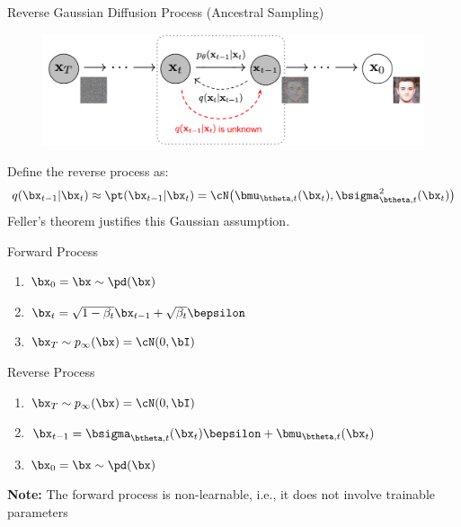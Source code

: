 \documentclass{beamer}
\begin{document}
\begin{frame}{Reverse Gaussian Diffusion Process (Ancestral Sampling)}
	\vspace{-0.3cm} 
	\begin{figure}
		\includegraphics[width=0.8\linewidth]{figs/DDPM}
	\end{figure}
	\vspace{-0.3cm} 
	Define the reverse process as: 
	\vspace{-0.2cm}
	\[
		q(\bx_{t-1}|\bx_{t}) \approx \pt(\bx_{t - 1} | \bx_t) = \cN\bigl(\bmu_{\btheta, t}(\bx_t), \bsigma^2_{\btheta, t}(\bx_t)\bigr)
	\]
	{\color{gray}Feller's theorem justifies this Gaussian assumption.}
	\eqpause
	\begin{minipage}{0.5\linewidth}
		\begin{block}{Forward Process}
			\begin{enumerate}
				\item $\bx_0 = \bx \sim \pd(\bx)$
				\item $\bx_t = \sqrt{1 - \beta_t} \bx_{t-1} + \sqrt{\beta_t} \bepsilon$
				\item $\bx_T \sim p_\infty(\bx) = \cN(0, \bI)$
			\end{enumerate}
		\end{block}
	\end{minipage}%
    \eqpause
	\begin{minipage}{0.55\linewidth}
		\begin{block}{Reverse Process}
			\begin{enumerate}
				\item $\bx_T \sim p_\infty(\bx) = \cN(0, \bI)$
				\item $\bx_{t-1} = \bsigma_{\btheta, t}(\bx_t) \bepsilon + \bmu_{\btheta, t}(\bx_t)$
				\item $\bx_0 = \bx \sim \pd(\bx)$
			\end{enumerate}
		\end{block}
	\end{minipage}
    \eqpause
	\textbf{Note:} The forward process is non-learnable, i.e., it does not involve trainable parameters
\end{frame}
\end{document}
